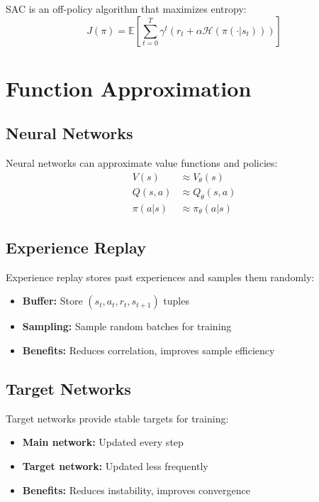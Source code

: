 SAC is an off-policy algorithm that maximizes entropy:
\begin{equation}
    J(\pi) = \mathbb{E}\left[\sum_{t=0}^T \gamma^t (r_t + \alpha \mathcal{H}(\pi(\cdot|s_t)))\right]
\end{equation}

\section{Function Approximation}

\subsection{Neural Networks}

Neural networks can approximate value functions and policies:
\begin{align}
    V(s) &\approx V_\theta(s) \\
    Q(s,a) &\approx Q_\theta(s,a) \\
    \pi(a|s) &\approx \pi_\theta(a|s)
\end{align}

\subsection{Experience Replay}

Experience replay stores past experiences and samples them randomly:
\begin{itemize}
    \item \textbf{Buffer:} Store $(s_t, a_t, r_t, s_{t+1})$ tuples
    \item \textbf{Sampling:} Sample random batches for training
    \item \textbf{Benefits:} Reduces correlation, improves sample efficiency
\end{itemize}

\subsection{Target Networks}

Target networks provide stable targets for training:
\begin{itemize}
    \item \textbf{Main network:} Updated every step
    \item \textbf{Target network:} Updated less frequently
    \item \textbf{Benefits:} Reduces instability, improves convergence
\end{itemize}

